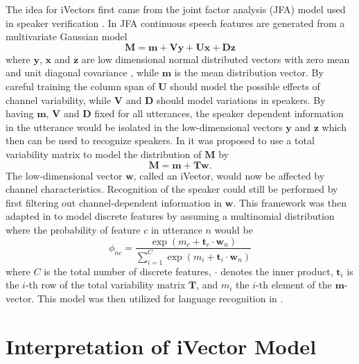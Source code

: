 The idea for iVectors first came from the joint factor analysis (JFA) model used in speaker verification \cite{dehak2011front}. In JFA continuous speech features are generated from a multivariate Gaussian model
\begin{equation}
\label{jfa}
\mathbf{M}=\mathbf{m}+\mathbf{Vy}+\mathbf{Ux}+\mathbf{Dz}
\end{equation}
where $\mathbf{y}$, $\mathbf{x}$ and $\mathbf{z}$ are low dimensional normal distributed vectors with zero mean and unit diagonal covariance \cite{dehak2011front}, while $\mathbf{m}$ is the mean distribution vector. By careful training the column span of $\mathbf{U}$ should model the possible effects of channel variability, while $\mathbf{V}$ and $\mathbf{D}$ should model variations in speakers. By having $\mathbf{m}$, $\mathbf{V}$ and $\mathbf{D}$ fixed for all utterances, the speaker dependent information in the utterance would be isolated in the low-dimensional vectors $\mathbf{y}$ and $\mathbf{z}$ which then can be used to recognize speakers. In \cite{dehak2011front} it was proposed to use a total variability matrix to model the distribution of $\mathbf{M}$ by
\begin{equation}
\label{ffa}
\mathbf{M}=\mathbf{m}+\mathbf{Tw}.
\end{equation}
The low-dimensional vector $\mathbf{w}$, called an iVector, would now be affected by channel characteristics. Recognition of the speaker could still be performed by first filtering out channel-dependent information in $\mathbf{w}$. This framework was then adapted in \cite{srivector} to model discrete features by assuming a multinomial distribution where the probability of feature $c$ in utterance $n$ would be 
\begin{equation}
\label{phieq}
\phi_{nc}=\frac{\exp(m_c+\mathbf{t}_c \cdot \mathbf{w}_n)}{\sum_{i=1}^C \exp(m_i+\mathbf{t}_i \cdot \mathbf{w}_n)}
\end{equation}
where $C$ is the total number of discrete features, $\cdot$ denotes the inner product, $\mathbf{t}_i$ is the $i$-th row of the total variability matrix $\mathbf{T}$, and $m_i$ the $i$-th element of the $\mathbf{m}$-vector. This model was then utilized for language recognition in \cite{lrivector}.

\section{Interpretation of iVector Model}

